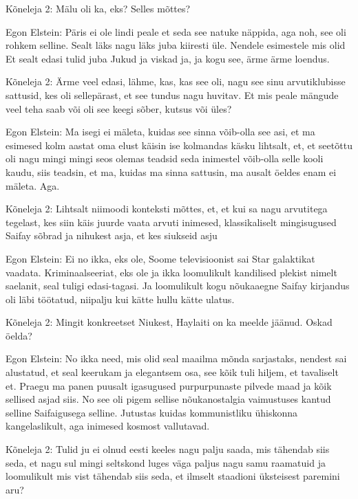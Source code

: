 Kõneleja 2:
Mälu oli ka, eks? Selles mõttes?
                 
Egon Elstein:
Päris ei ole lindi peale et seda see natuke näppida, aga noh, see oli rohkem selline. Sealt läks nagu läks juba kiiresti üle.
Nendele esimestele mis olid
Et sealt edasi tulid juba Jukud ja viskad ja, ja kogu see, ärme ärme loendus.
                 
Kõneleja 2:
Ärme veel edasi, lähme, kas, kas see oli, nagu see sinu arvutiklubisse sattusid, kes oli sellepärast, et see tundus nagu huvitav. Et mis peale mängude veel teha saab või oli see keegi sõber, kutsus või üles?
                 
Egon Elstein:
Ma isegi ei mäleta, kuidas see sinna võib-olla see asi, et ma esimesed kolm aastat oma elust käisin ise kolmandas käsku lihtsalt, et, et seetõttu oli nagu mingi mingi seos olemas teadsid seda inimestel võib-olla selle kooli kaudu, siis teadsin, et ma, kuidas ma sinna sattusin, ma ausalt öeldes enam ei mäleta. Aga.
                 
Kõneleja 2:
Lihtsalt niimoodi konteksti mõttes, et, et kui sa nagu arvutitega tegelast, kes siin käis juurde vaata arvuti inimesed, klassikaliselt mingisugused Saifay sõbrad ja nihukest asja, et kes siukseid asju
                 
Egon Elstein:
Ei no ikka, eks ole, Soome televisioonist sai Star galaktikat vaadata.
Kriminaalseeriat, eks ole ja ikka loomulikult kandilised plekist nimelt saelanit, seal tuligi edasi-tagasi. Ja loomulikult kogu nõukaaegne Saifay kirjandus oli läbi töötatud, niipalju kui kätte hullu kätte ulatus.
                 
Kõneleja 2:
Mingit konkreetset Niukest, Haylaiti on ka meelde jäänud. Oskad öelda?
                 
Egon Elstein:
No ikka need, mis olid seal maailma mõnda sarjastaks, nendest sai alustatud, et seal keerukam ja elegantsem osa, see kõik tuli hiljem, et tavaliselt et.
Praegu ma panen puusalt igasugused purpurpunaste pilvede maad ja kõik sellised asjad siis.
No see oli pigem sellise nõukanostalgia vaimustuses kantud selline Saifaigusega selline. Jutustas kuidas kommunistliku ühiskonna kangelaslikult, aga inimesed kosmost vallutavad.
                 
Kõneleja 2:
Tulid ju ei olnud eesti keeles nagu palju saada, mis tähendab siis seda, et nagu sul mingi seltskond luges väga paljus nagu samu raamatuid ja loomulikult mis vist tähendab siis seda, et ilmselt staadioni üksteisest paremini aru?
                 
